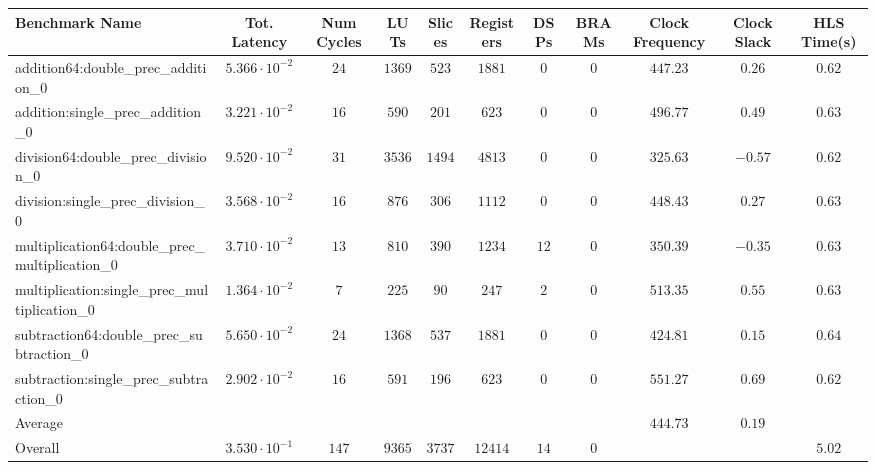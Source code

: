 \begin{tabular}{|l|c|c|c|c|c|c|c|c|c|c|}
\hline
Benchmark Name                                   & Tot. Latency            & Num Cycles & LUTs     & Slices   & Registers & DSPs   & BRAMs & Clock Frequency & Clock Slack & HLS Time(s) \\
\hline
addition64:double\_prec\_addition\_0             & $ 5.366 \cdot 10^{-2} $ & $ 24     $ & $ 1369 $ & $ 523  $ & $ 1881  $ & $ 0  $ & $ 0 $ & $ 447.23      $ & $ 0.26    $ & $ 0.62    $ \\
addition:single\_prec\_addition\_0               & $ 3.221 \cdot 10^{-2} $ & $ 16     $ & $ 590  $ & $ 201  $ & $ 623   $ & $ 0  $ & $ 0 $ & $ 496.77      $ & $ 0.49    $ & $ 0.63    $ \\
division64:double\_prec\_division\_0             & $ 9.520 \cdot 10^{-2} $ & $ 31     $ & $ 3536 $ & $ 1494 $ & $ 4813  $ & $ 0  $ & $ 0 $ & $ 325.63      $ & $ -0.57   $ & $ 0.62    $ \\
division:single\_prec\_division\_0               & $ 3.568 \cdot 10^{-2} $ & $ 16     $ & $ 876  $ & $ 306  $ & $ 1112  $ & $ 0  $ & $ 0 $ & $ 448.43      $ & $ 0.27    $ & $ 0.63    $ \\
multiplication64:double\_prec\_multiplication\_0 & $ 3.710 \cdot 10^{-2} $ & $ 13     $ & $ 810  $ & $ 390  $ & $ 1234  $ & $ 12 $ & $ 0 $ & $ 350.39      $ & $ -0.35   $ & $ 0.63    $ \\
multiplication:single\_prec\_multiplication\_0   & $ 1.364 \cdot 10^{-2} $ & $ 7      $ & $ 225  $ & $ 90   $ & $ 247   $ & $ 2  $ & $ 0 $ & $ 513.35      $ & $ 0.55    $ & $ 0.63    $ \\
subtraction64:double\_prec\_subtraction\_0       & $ 5.650 \cdot 10^{-2} $ & $ 24     $ & $ 1368 $ & $ 537  $ & $ 1881  $ & $ 0  $ & $ 0 $ & $ 424.81      $ & $ 0.15    $ & $ 0.64    $ \\
subtraction:single\_prec\_subtraction\_0         & $ 2.902 \cdot 10^{-2} $ & $ 16     $ & $ 591  $ & $ 196  $ & $ 623   $ & $ 0  $ & $ 0 $ & $ 551.27      $ & $ 0.69    $ & $ 0.62    $ \\
\hline
Average                                          & $                     $ & $        $ & $      $ & $      $ & $       $ & $    $ & $   $ & $ 444.73      $ & $ 0.19    $ & $         $ \\
\hline
Overall                                          & $ 3.530 \cdot 10^{-1} $ & $ 147    $ & $ 9365 $ & $ 3737 $ & $ 12414 $ & $ 14 $ & $ 0 $ & $             $ & $         $ & $ 5.02    $ \\
\hline
\end{tabular}

